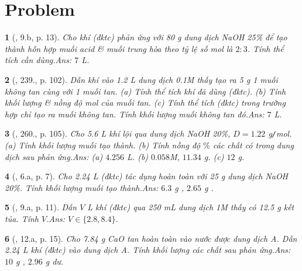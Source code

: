 \documentclass{article}
\newtheorem{baitoan}{}
\begin{document}

\section{Problem}

\begin{baitoan}[\cite{An_400_BT_Hoa_Hoc_9}, 9.b, p. 13]
	Cho khí {\rm{}} (đktc) phản ứng với {\rm80 g} dung dịch {\rm NaOH 25\%} để tạo thành hỗn hợp muối acid \& muối trung hòa theo tỷ lệ số mol là $2:3$. Tính thể tích {\rm{}} cần dùng.\hfill{\sf Ans: $7$ L.}
\end{baitoan}

\begin{baitoan}[\cite{Nguyen_Buu_Can_500_BT_Hoa_Hoc_THCS}, 239., p. 102]
	Dẫn khí {\rm{}} vào {\rm1.2 L} dung dịch {\rm{} 0.1M} thấy tạo ra {\rm5 g} 1 muối không tan cùng với 1 muối tan. (a) Tính thể tích khí {\rm{}} đã dùng (đktc). (b) Tính khối lượng \& nồng độ mol của muối tan. (c) Tính thể tích {\rm{}} (đktc) trong trường hợp chỉ tạo ra muối không tan. Tính khối lượng muối không tan đó.\hfill{\sf Ans: $7$ L.}
\end{baitoan}

\begin{baitoan}[\cite{Nguyen_Buu_Can_500_BT_Hoa_Hoc_THCS}, 260., p. 105]
	Cho {\rm5.6 L} khí {\rm{}} lội qua dung dịch {\rm NaOH 20\%}, $D = 1.22$ {\rm g{\tt/}mol}. (a) Tính khối lượng muối tạo thành. (b) Tính nồng độ $\%$ các chất có trong dung dịch sau phản ứng.\hfill{\sf Ans: (a) $4.256$ L. (b) $0.058$M, $11.34$ g. (c) $12$ g.}
\end{baitoan}

\begin{baitoan}[\cite{An_350_BT_Hoa_Hoc_9}, 6.a, p. 7]
	Cho \emph{2.24 L } (đktc) tác dụng hoàn toàn với \emph{25 g} dung dịch \emph{NaOH 20\%}. Tính khối lượng muối tạo thành.\hfill{\sf Ans: $6.3$ g , $2.65$ g .}
\end{baitoan}

\begin{baitoan}[\cite{An_350_BT_Hoa_Hoc_9}, 9.a, p. 11]
	Dẫn $V$ \emph{L} khí \emph{} (đktc) qua \emph{250 mL} dung dịch \emph{ 1M} thấy có \emph{12.5 g} kết tủa. Tính $V$.\hfill{\sf Ans: $V\in\{2.8,8.4\}$.}
\end{baitoan}

\begin{baitoan}[\cite{An_350_BT_Hoa_Hoc_9}, 12.a, p. 15]
	Cho \emph{7.84 g CaO} tan hoàn toàn vào nước được dung dịch A. Dẫn \emph{2.24 L} khí \emph{} (đktc) vào dung dịch A. Tính khối lượng các chất sau phản ứng.\hfill{\sf Ans: $10$ g , $2.96$ g  dư.}
\end{baitoan}
\end{document}
